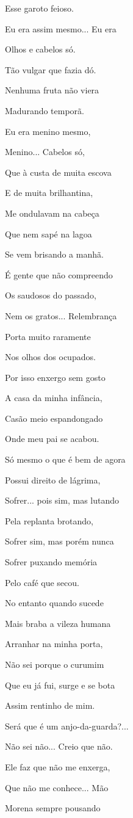 Esse garoto feioso.

Eu era assim mesmo... Eu era

Olhos e cabelos só.

Tão vulgar que fazia dó.

Nenhuma fruta não viera

Madurando temporã.

Eu era menino mesmo,

Menino... Cabelos só,

Que à custa de muita escova

E de muita brilhantina,

Me ondulavam na cabeça

Que nem sapé na lagoa

Se vem brisando a manhã.

É gente que não compreendo

Os saudosos do passado,

Nem os gratos... Relembrança

Porta muito raramente

Nos olhos dos ocupados.

Por isso enxergo sem gosto

A casa da minha infância,

Casão meio espandongado

Onde meu pai se acabou.

Só mesmo o que é bem de agora

Possui direito de lágrima,

Sofrer... pois sim, mas lutando

Pela replanta brotando,

Sofrer sim, mas porém nunca

Sofrer puxando memória

Pelo café que secou.

No entanto quando sucede

Mais braba a vileza humana

Arranhar na minha porta,

Não sei porque o curumim

Que eu já fui, surge e se bota

Assim rentinho de mim.

Será que é um anjo-da-guarda?...

Não sei não... Creio que não.

Ele faz que não me enxerga,

Que não me conhece... Mão

Morena sempre pousando

